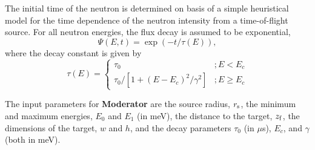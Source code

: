 The initial time of the neutron is determined on basis of a 
simple heuristical model for the time dependence of the 
neutron intensity from a time-of-flight source.
For all neutron energies, the flux decay is assumed to be exponential,
\begin{equation}
\Psi(E,t) = \exp(-t/\tau(E)) ,
\end{equation}
where the decay constant is given by
\begin{equation}
\tau(E) = \left\{ 
\begin{array}{cc}
 \tau_0                               & ; E<E_c \\
 \tau_0 / [ 1 + (E-E_c)^2/\gamma^2 ]  & ; E \geq E_c
\end{array}
\right.
\end{equation}

The input parameters for {\bf Moderator} are the source radius, $r_{\rm s}$,
the minimum and maximum energies, $E_0$ and $E_1$ (in meV),
the distance to the target, $z_{\rm f}$, the dimensions of the target,
$w$ and $h$, and the decay parameters 
$\tau_0$ (in $\mu$s), $E_c$, and $\gamma$ (both in meV).





